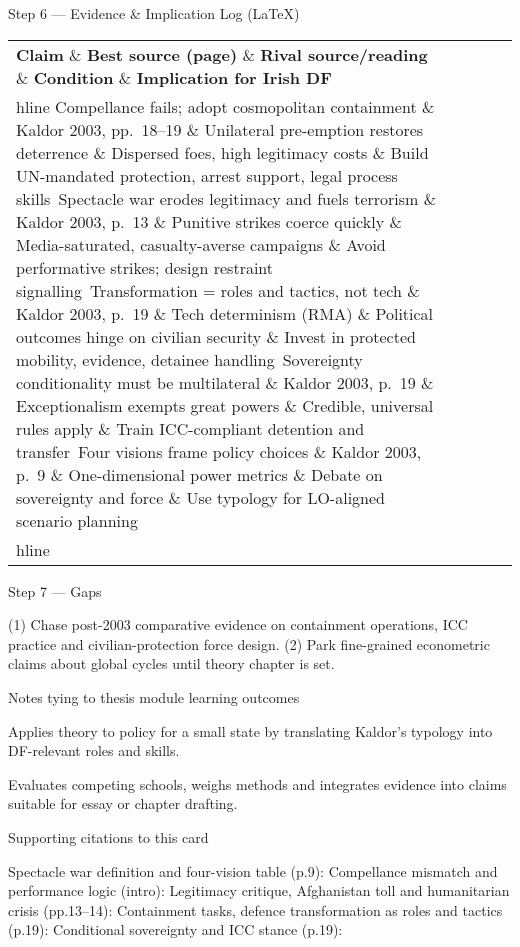 Step 6 — Evidence \& Implication Log (LaTeX)

 
\begin{tabular}{p{3.2cm}p{4.2cm}p{3.6cm}p{3.2cm}p{4.2cm}}
	\textbf{Claim} \& \textbf{Best source (page)} \& \textbf{Rival source/reading} \& \textbf{Condition} \& \textbf{Implication for Irish DF}\\hline
	Compellance fails; adopt cosmopolitan containment \& Kaldor 2003, pp.~18–19 \& Unilateral pre-emption restores deterrence \& Dispersed foes, high legitimacy costs \& Build UN-mandated protection, arrest support, legal process skills\
	Spectacle war erodes legitimacy and fuels terrorism \& Kaldor 2003, p.~13 \& Punitive strikes coerce quickly \& Media-saturated, casualty-averse campaigns \& Avoid performative strikes; design restraint signalling\
	Transformation = roles and tactics, not tech \& Kaldor 2003, p.~19 \& Tech determinism (RMA) \& Political outcomes hinge on civilian security \& Invest in protected mobility, evidence, detainee handling\
	Sovereignty conditionality must be multilateral \& Kaldor 2003, p.~19 \& Exceptionalism exempts great powers \& Credible, universal rules apply \& Train ICC-compliant detention and transfer\
	Four visions frame policy choices \& Kaldor 2003, p.~9 \& One-dimensional power metrics \& Debate on sovereignty and force \& Use typology for LO-aligned scenario planning\\hline
\end{tabular}

Step 7 — Gaps

(1) Chase post-2003 comparative evidence on containment operations, ICC practice and civilian-protection force design.
(2) Park fine-grained econometric claims about global cycles until theory chapter is set.

Notes tying to thesis module learning outcomes

Applies theory to policy for a small state by translating Kaldor’s typology into DF-relevant roles and skills.

Evaluates competing schools, weighs methods and integrates evidence into claims suitable for essay or chapter drafting.

Supporting citations to this card

Spectacle war definition and four-vision table (p.9):
Compellance mismatch and performance logic (intro):
Legitimacy critique, Afghanistan toll and humanitarian crisis (pp.13–14):
Containment tasks, defence transformation as roles and tactics (p.19):
Conditional sovereignty and ICC stance (p.19):

